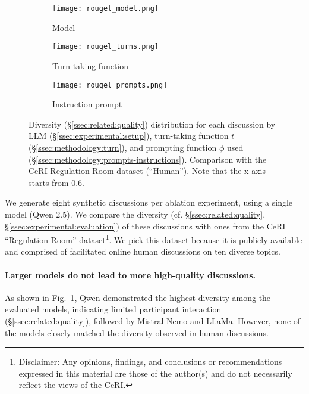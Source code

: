 \begin{figure*}[t]
    \begin{subfigure}{0.32\linewidth}
        \texttt{[image: rougel\_model.png]}
        \caption{Model}
        \label{fig:rougel_model}
    \end{subfigure}%
    \hfill
    \begin{subfigure}{0.32\linewidth}
        \texttt{[image: rougel\_turns.png]}
        \caption{Turn-taking function}
        \label{fig:rougel_turns}
    \end{subfigure}%
    \hfill
    \begin{subfigure}{0.32\linewidth}
        \texttt{[image: rougel\_prompts.png]}
        \caption{Instruction prompt}
        \label{fig:rougel_prompts}
    \end{subfigure}%

    \caption{Diversity (\S\ref{ssec:related:quality}) distribution for each discussion by LLM (\S\ref{ssec:experimental:setup}), turn-taking function $t$ (\S\ref{ssec:methodology:turn}), and prompting function $\phi$ used (\S\ref{ssec:methodology:prompts-instructions}). Comparison with the CeRI Regulation Room dataset (``Human''). Note that the x-axis starts from $0.6$.}
    \label{fig:diversity}
\end{figure*}

We generate eight synthetic discussions per ablation experiment, using a single model (Qwen 2.5). We compare the diversity (cf. \S\ref{ssec:related:quality}, \S\ref{ssec:experimental:evaluation}) of these discussions with ones from the CeRI “Regulation Room” dataset\footnote{Disclaimer: Any opinions, findings, and conclusions or recommendations expressed in this material are those of the author(s) and do not necessarily reflect the views of the CeRI.}. We pick this dataset because it is publicly available and comprised of facilitated online human discussions on ten diverse topics.

\paragraph{Larger models do not lead to more high-quality discussions.} As shown in Fig.~\ref{fig:rougel_model}, Qwen demonstrated the highest diversity among the evaluated models, indicating limited participant interaction (\S\ref{ssec:related:quality}), followed by Mistral Nemo and LLaMa. However, none of the models closely matched the diversity observed in human discussions. 


